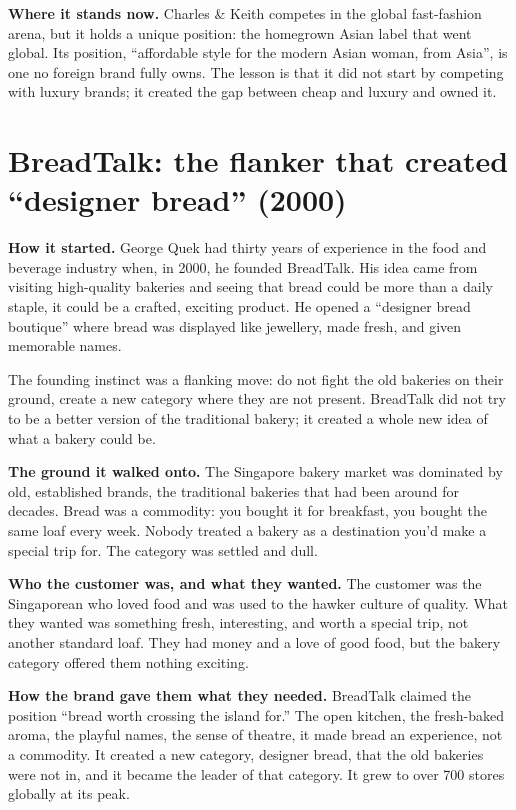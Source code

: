 \documentclass[10pt,twoside,openany]{memoir}
\newcommand{\needspacehead}{\needspace{4\baselineskip}}
\let\oldsection\section
\renewcommand{\section}{\needspacehead\oldsection}
\begin{document}
\textbf{Where it stands now.} Charles \& Keith competes in the global
fast-fashion arena, but it holds a unique position: the homegrown Asian
label that went global. Its position, ``affordable style for the modern
Asian woman, from Asia'', is one no foreign brand fully owns. The lesson
is that it did not start by competing with luxury brands; it created the
gap between cheap and luxury and owned it.

\section{BreadTalk: the flanker that created ``designer bread''
(2000)}\label{breadtalk-the-flanker-that-created-designer-bread-2000}

\textbf{How it started.} George Quek had thirty years of experience in
the food and beverage industry when, in 2000, he founded BreadTalk. His
idea came from visiting high-quality bakeries and seeing that bread
could be more than a daily staple, it could be a crafted, exciting
product. He opened a ``designer bread boutique'' where bread was
displayed like jewellery, made fresh, and given memorable names.

The founding instinct was a flanking move: do not fight the old bakeries
on their ground, create a new category where they are not present.
BreadTalk did not try to be a better version of the traditional bakery;
it created a whole new idea of what a bakery could be.

\textbf{The ground it walked onto.} The Singapore bakery market was
dominated by old, established brands, the traditional bakeries that had
been around for decades. Bread was a commodity: you bought it for
breakfast, you bought the same loaf every week. Nobody treated a bakery
as a destination you'd make a special trip for. The category was settled
and dull.

\textbf{Who the customer was, and what they wanted.} The customer was
the Singaporean who loved food and was used to the hawker culture of
quality. What they wanted was something fresh, interesting, and worth a
special trip, not another standard loaf. They had money and a love of
good food, but the bakery category offered them nothing exciting.

\textbf{How the brand gave them what they needed.} BreadTalk claimed the
position ``bread worth crossing the island for.'' The open kitchen, the
fresh-baked aroma, the playful names, the sense of theatre, it made
bread an experience, not a commodity. It created a new category,
designer bread, that the old bakeries were not in, and it became the
leader of that category. It grew to over 700 stores globally at its
peak.
\end{document}
